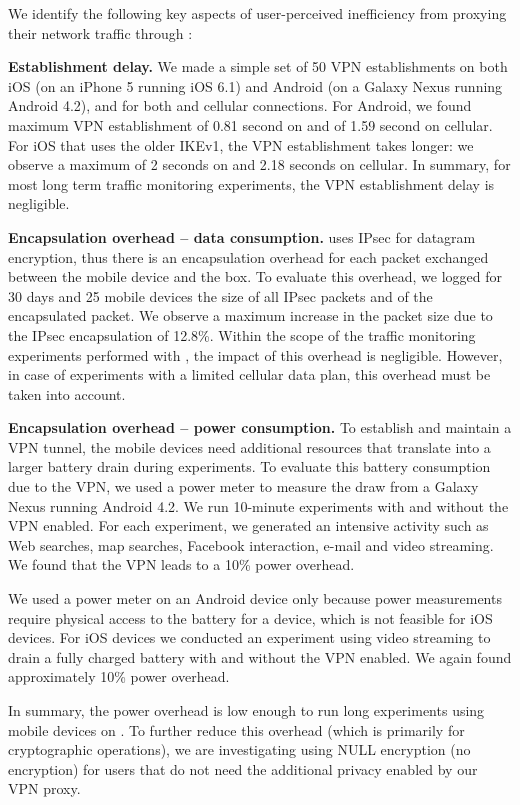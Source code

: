 We identify the following key aspects of user-perceived inefficiency from 
proxying their network traffic through \platname{}: 
\begin{packeditemize}
\item \textbf{Establishment delay.} We made a simple set of 50 VPN establishments on both iOS (on an
iPhone 5 running iOS 6.1) and Android (on a Galaxy Nexus running
Android 4.2), and for both \wifi{} and cellular connections. For
Android, we found maximum VPN establishment of 0.81 second on \wifi{}
and of 1.59 second on cellular. For iOS that uses the older IKEv1, the
VPN establishment takes longer: we observe a maximum of 2 seconds on
\wifi{} and 2.18 seconds on cellular.  In summary, for most long term
traffic monitoring experiments, the VPN establishment delay is
negligible. 
\item \textbf{Encapsulation overhead -- data consumption.} \platname{} uses IPsec for datagram encryption, thus there is
an encapsulation overhead for each packet exchanged between the mobile
device and the \platname{} box. To evaluate this overhead, we logged
for 30 days and 25 mobile devices the size of all IPsec packets and of
the encapsulated packet. We observe a maximum increase in the packet
size due to the IPsec encapsulation of 12.8\%. Within the scope of the
traffic monitoring experiments performed with \platname{}, the impact
of this overhead is negligible. However, in case of experiments with a
limited cellular data plan, this overhead must be taken into account.

\item \textbf{Encapsulation overhead -- power consumption.}
To establish and maintain a VPN tunnel, the mobile devices need
additional resources that translate into a larger battery drain during
experiments. To evaluate this battery consumption due to the VPN, we
used a power meter to measure the draw from a Galaxy Nexus running
Android 4.2. We run 10-minute experiments with and without the VPN
enabled. For each experiment, we generated an intensive activity such
as Web searches, map searches, Facebook interaction, e-mail and video
streaming. We found that the VPN leads to a 10\% power overhead. 

We used a power meter on an Android device only because power
measurements require physical access to the battery for a device,
which is not feasible for iOS devices. For iOS devices we conducted
an experiment using video streaming to drain a fully charged battery with 
and without the VPN enabled. We again found approximately 10\% power overhead. 

In summary, the power overhead is low enough to run long experiments
using mobile devices on \platname. To further reduce this overhead (which 
is primarily for cryptographic operations), we are investigating using NULL 
encryption (\ie no encryption) for users that do not need 
the additional privacy enabled by our VPN proxy.

\end{packeditemize}

